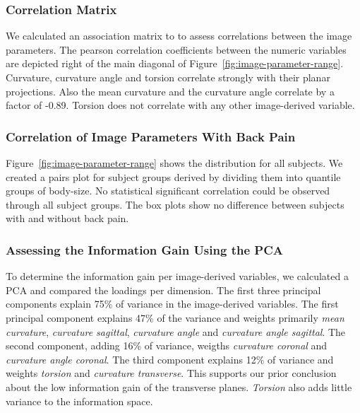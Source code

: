 \documentclass[a4paper,twoside]{style/article}
\begin{document}
\subsubsection{Correlation Matrix}
We calculated an association matrix to to assess correlations between the image parameters.
The pearson correlation coefficients between the numeric variables are depicted right of the main diagonal of Figure~\ref{fig:image-parameter-range}.
Curvature, curvature angle and torsion correlate strongly with their planar projections.
Also the mean curvature and the curvature angle correlate by a factor of -0.89.
Torsion does not correlate with any other image-derived variable.
\subsubsection{Correlation of Image Parameters With Back Pain}
Figure~\ref{fig:image-parameter-range} shows the distribution for all subjects.
We created a pairs plot for subject groups derived by dividing them into quantile groups of body-size.
No statistical significant correlation could be observed through all subject groups.
The box plots show no difference between subjects with and without back pain.

\subsubsection{Assessing the Information Gain Using the PCA}
To determine the information gain per image-derived variables, we calculated a PCA and compared the loadings per dimension.
The first three principal components explain 75\% of variance in the image-derived variables.
The first principal component explains 47\% of the variance and weights primarily \emph{mean curvature}, \emph{curvature sagittal}, \emph{curvature angle} and \emph{curvature angle sagittal}.
The second component, adding 16\% of variance, weigths  \emph{curvature coronal} and \emph{curvature angle coronal}.
The third component explains 12\% of variance and weights \emph{torsion} and \emph{curvature transverse}.
This supports our prior conclusion about the low information gain of the transverse planes.
\emph{Torsion} also adds little variance to the information space.
\end{document}
